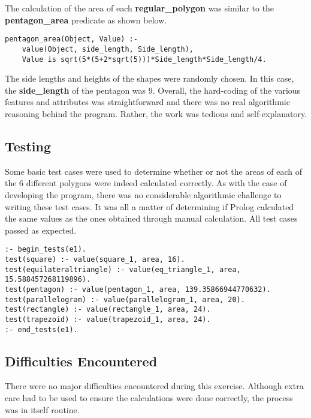 \documentclass[11pt]{article}
\newcommand{\forceindent}{\leavevmode{\parindent=1em\indent}}
\begin{document}
\forceindent The calculation of the area of each \textbf{regular\_polygon} was similar to the \textbf{pentagon\_area} predicate as shown below.\\

\begin{lstlisting}
pentagon_area(Object, Value) :- 
	value(Object, side_length, Side_length),
	Value is sqrt(5*(5+2*sqrt(5)))*Side_length*Side_length/4.
\end{lstlisting}
\vspace{0.5cm}
\forceindent The side lengths and heights of the shapes were randomly chosen. In this case, the \textbf{side\_length} of the pentagon was 9. Overall, the hard-coding of the various features and attributes was straightforward and there was no real algorithmic reasoning behind the program. Rather, the work was tedious and self-explanatory.
 
\subsection{Testing}
\forceindent Some basic test cases were used to determine whether or not the areas of each of the 6 different polygons were indeed calculated correctly. As with the case of developing the program, there was no considerable algorithmic challenge to writing these test cases. It was all a matter of determining if Prolog calculated the same values as the ones obtained through manual calculation. All test cases passed as expected.

\begin{lstlisting}
:- begin_tests(e1).
test(square) :- value(square_1, area, 16).
test(equilateraltriangle) :- value(eq_triangle_1, area, 15.588457268119896).
test(pentagon) :- value(pentagon_1, area, 139.35866944770632).
test(parallelogram) :- value(parallelogram_1, area, 20).
test(rectangle) :- value(rectangle_1, area, 24).
test(trapezoid) :- value(trapezoid_1, area, 24).
:- end_tests(e1).
\end{lstlisting}

\subsection{Difficulties Encountered}
\forceindent There were no major difficulties encountered during this exercise. Although extra care had to be used to ensure the calculations were done correctly, the process was in itself routine.
\end{document}

